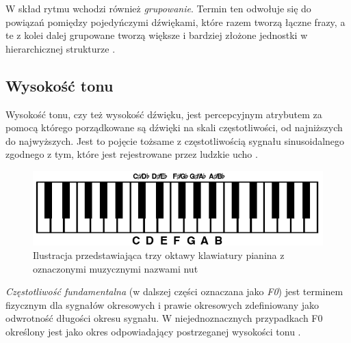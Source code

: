 \documentclass[12pt,a4paper,twoside]{mwart}
\begin{document}
W skład rytmu wchodzi również \textit{grupowanie}. Termin ten odwołuje się do powiązań pomiędzy pojedyńczymi dźwiękami, które razem tworzą łączne frazy, a te z kolei dalej grupowane tworzą większe i bardziej złożone jednostki w hierarchicznej strukturze 
\cite[12-35]{Transcription:Lerdahl:GenerativeTheory}
.

\subsection{Wysokość tonu}\label{sec:pitch}
Wysokość tonu, czy też wysokość dźwięku, jest percepcyjnym atrybutem za pomocą którego porządkowane są dźwięki na skali częstotliwości, od najniższych do najwyższych. Jest to pojęcie tożsame z częstotliwością sygnału sinusoidalnego zgodnego z tym, które jest rejestrowane przez ludzkie ucho 
\cite[3492-3493]{Transcription:Hartmann:PitchPeriodicityAuditoryOrganization}
. 

\begin{figure}[H]
  \begin{center}
    \includegraphics[scale=0.5]{images/PianoRoll.png}
    \caption{Ilustracja przedstawiająca trzy oktawy klawiatury pianina z oznaczonymi muzycznymi nazwami nut}
    \label{fig:pianoRoll}
  \end{center}
\end{figure}

\textit{Częstotliwość fundamentalna} (w dalszej części oznaczana jako \textit{F0}) jest terminem fizycznym dla sygnałów okresowych i prawie okresowych zdefiniowany jako odwrotność długości okresu sygnału. W niejednoznacznych przypadkach F0 określony jest jako okres odpowiadający postrzeganej wysokości tonu 
\cite[8]{Transcription:Anssi:SignalProcessingMethods}
.
\end{document}
